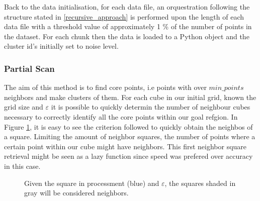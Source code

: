 \documentclass[10pt,journal,compsoc]{IEEEtran}
\let\MYoriglatexcaption\caption
\renewcommand{\caption}[2][\relax]{\MYoriglatexcaption[#2]{#2}}
\begin{document}
Back to the data initialisation, for each data file, an orquestration following the structure stated in \ref{recursive_approach} is performed upon the length of each data file with a threshold value of approximately 1 \% of the number of points in the dataset. For each chunk then the data is loaded to a Python object and the cluster id's initially set to noise level.

\subsubsection{Partial Scan} \label{sec:partial-scan}
The aim of this method is to find core points, i.e points with over $min\_points$ neighbors and make clusters of them. For each cube in our initial grid, known the grid size and $\varepsilon$ it is possible to quickly determin the number of neighbour cubes necessary to correctly identify all the core points within our goal refgion. In Figure \ref{fig:neigh-loc}, it is easy to see the criterion followed to quickly obtain the neighbos of a square. Limiting the amount of neighbor squares, the number of points where a certain point within our cube might have neighbors. This first neighbor square retrieval might be seen as a lazy function since speed was prefered over accuracy in this case.

\begin{figure}[!h]
\centering
{}
\caption{Given the square in processment (blue) and $\varepsilon$, the squares shaded in gray will be considered neighbors. \label{fig:neigh-loc}}
\end{figure}
\end{document}
